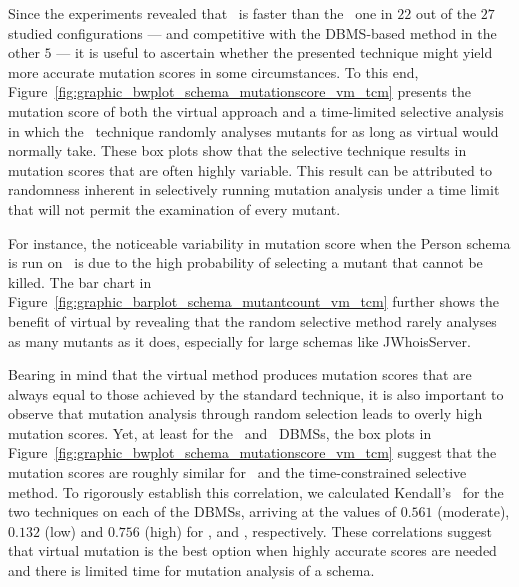


 Since the experiments revealed that \vma~is faster than the \Original~one in $22$ out of the $27$ studied configurations --- and competitive with the DBMS-based method in the other $5$ --- it is useful to ascertain whether the presented technique might yield more accurate mutation scores in some circumstances. To this end, Figure~\ref{fig:graphic_bwplot_schema_mutationscore_vm_tcm} presents the mutation score of both the virtual approach and a time-limited selective analysis in which the \Original~technique randomly analyses mutants for as long as virtual would normally take. These box plots show that the selective technique results in mutation scores that are often highly variable. This result can be attributed to randomness inherent in selectively running mutation analysis under a time limit that will not permit the examination of every mutant.

%

For instance, the noticeable variability in mutation score when the Person schema is run on \Postgres~is due to the high probability of selecting a mutant that cannot be killed. The bar chart in Figure~\ref{fig:graphic_barplot_schema_mutantcount_vm_tcm} further shows the benefit of virtual by revealing that the random selective method rarely analyses as many mutants as it does, especially for large schemas like JWhoisServer.

Bearing in mind that the virtual method produces mutation scores that are always equal to those achieved by the standard
technique, it is also important to observe that mutation analysis through random selection leads to overly high mutation
scores.  Yet, at least for the \HyperSQL~and \SQLite~DBMSs, the box plots in
Figure~\ref{fig:graphic_bwplot_schema_mutationscore_vm_tcm} suggest that the mutation scores are roughly similar for
\vma~and the time-constrained selective method. To rigorously establish this correlation, we calculated Kendall's \taub~for the two techniques on each of the DBMSs, arriving at the values of $0.561$ (moderate), $0.132$ (low) and $0.756$ (high) for \HyperSQL, \PostgreSQL and \sqlite, respectively. These correlations suggest that virtual mutation is the best option when highly accurate scores are needed and there is limited time for mutation analysis of a schema.

